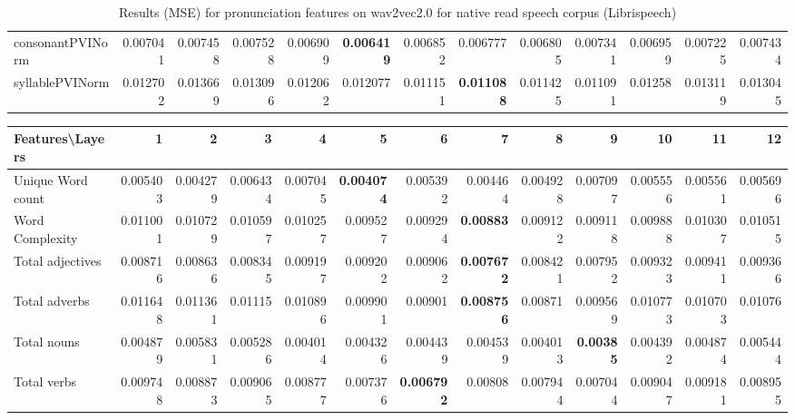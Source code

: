 \documentclass[sigconf]{acmart}
\begin{document}
\begin{table*}[!htb]
\begin{adjustbox}{width=1\textwidth}
\begin{tabular}{@{}l|rrrrrrrrrrrr@{}}
consonantPVINorm & 0.007041 & 0.007458 & 0.007528 & 0.006909 & \textbf{0.006419} & 0.006852 & 0.006777 & 0.006805 & 0.007341 & 0.006959 & 0.007225 & 0.007434 \\
syllablePVINorm & 0.012702 & 0.013669 & 0.013096 & 0.012062 & 0.012077 & 0.011151 & \textbf{0.011088} & 0.011425 & 0.011091 & 0.01258 & 0.013119 & 0.013045 \\ \bottomrule
\end{tabular}
\end{adjustbox}
\vspace{1 mm}
\caption{\label{Pron_W} \small  Results (MSE) for pronunciation features on wav2vec2.0 for native read speech corpus (Librispeech)}

\end{table*}


\begin{table*}[]
\begin{adjustbox}{width=1\textwidth}
\begin{tabular}{@{}l|rrrrrrrrrrrr@{}}
\toprule
\textbf{Features\textbackslash{}Layers} & 1        & 2        & 3        & 4        & 5        & 6        & 7        & 8        & 9        & 10       & 11       & 12       \\ \midrule
Unique Word count              & 0.005403 & 0.004279 & 0.006434 & 0.007045 & \textbf{0.004074} & 0.005392          & 0.004464          & 0.004928          & 0.007097          & 0.005556 & 0.005561 & 0.005696          \\
Word Complexity                & 0.011001 & 0.010729 & 0.010597 & 0.010257 & 0.009527          & 0.009294          & \textbf{0.00883}  & 0.009122          & 0.009118          & 0.009888 & 0.010307 & 0.010515          \\
Total adjectives               & 0.008716 & 0.008636 & 0.008345 & 0.009197 & 0.009202          & 0.009062          & \textbf{0.007672} & 0.008421          & 0.007952          & 0.009323 & 0.009411 & 0.009366          \\
Total adverbs                  & 0.011648 & 0.011361 & 0.01115  & 0.010896 & 0.009901          & 0.00901           & \textbf{0.008756} & 0.00871           & 0.009569          & 0.010773 & 0.010703 & 0.01076           \\
Total nouns                    & 0.004879 & 0.005831 & 0.005286 & 0.004014 & 0.004326          & 0.004439          & 0.004539          & 0.004013          & \textbf{0.00385}  & 0.004392 & 0.004874 & 0.005444          \\
Total verbs                    & 0.009748 & 0.008873 & 0.009065 & 0.008777 & 0.007376          & \textbf{0.006792} & 0.00808           & 0.007944          & 0.007044          & 0.009047 & 0.009181 & 0.008955          \\

\end{tabular}
\end{adjustbox}
\end{table*}
\end{document}
